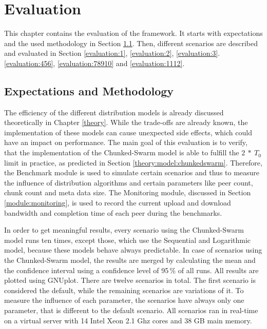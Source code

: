 
\chapter{Evaluation}
\label{evaluation}

This chapter contains the evaluation of the framework. It starts with expectations and the used methodology in Section \ref{evaluation:expectations}. Then, different scenarios are described and evaluated in Section \ref{evaluation:1}, \ref{evaluation:2}, \ref{evaluation:3}. \ref{evaluation:456}, \ref{evaluation:78910} and \ref{evaluation:1112}.

\section{Expectations and Methodology}
\label{evaluation:expectations}

The efficiency of the different distribution models is already discussed theoretically in Chapter \ref{theory}. While the trade-offs are already known, the implementation of these models can cause unexpected side effects, which could have an impact on performance. The main goal of this evaluation is to verify, that the implementation of the Chunked-Swarm model is able to fulfill the $2\:*\:T_0$ limit in practice, as predicted in Section \ref{theory:model:chunkedswarm}. Therefore, the Benchmark module is used to simulate certain scenarios and thus to measure the influence of distribution algorithms and certain parameters like peer count, chunk count and meta data size. The Monitoring module, discussed in Section \ref{module:monitoring}, is used to record the current upload and download bandwidth and completion time of each peer during the benchmarks.

In order to get meaningful results, every scenario using the Chunked-Swarm model runs ten times, except those, which use the Sequential and Logarithmic model, because these models behave always predictable. In case of scenarios using the Chunked-Swarm model, the results are merged by calculating the mean and the confidence interval using a confidence level of 95\,\% of all runs. All results are plotted using GNUplot. There are twelve scenarios in total. The first scenario is considered the default, while the remaining scenarios are variations of it. To measure the influence of each parameter, the scenarios have always only one parameter, that is different to the default scenario. All scenarios ran in real-time on a virtual server with 14 Intel Xeon 2.1 Ghz cores and 38 GB main memory.

